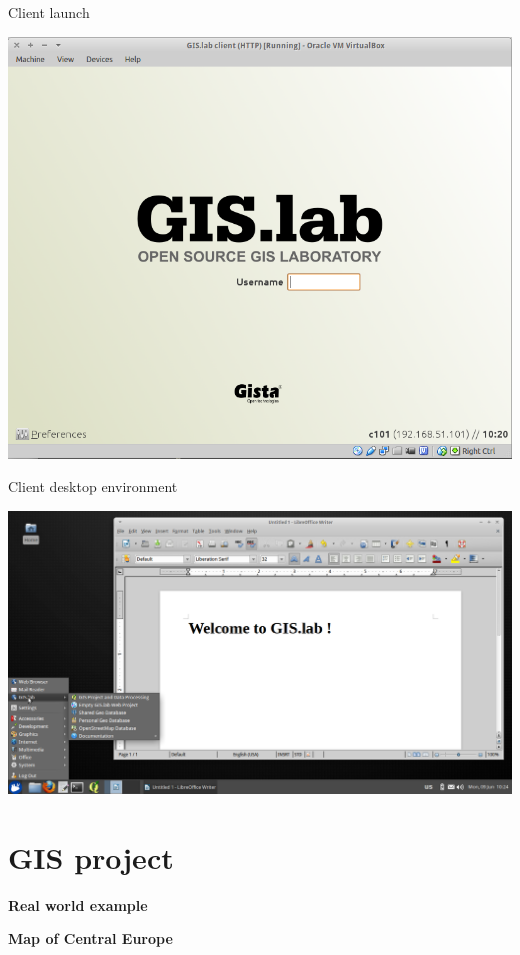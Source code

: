 \documentclass[12pt]{beamer}
\begin{document}
\begin{frame}{Client launch}
	\begin{center}
		\includegraphics[keepaspectratio=true,height=0.7\textheight]{images/real-world-example/client-login.png}
	\end{center}
\end{frame}


\begin{frame}{Client desktop environment}
	\begin{center}
		\includegraphics[keepaspectratio=true,height=0.7\textheight]{images/real-world-example/client-desktop-libreoffice.png}
	\end{center}
\end{frame}


\section{GIS project}
\begin{frame}
	\begin{center}
		\LARGE\textbf{Real world example}\normalsize

		\textbf{Map of Central Europe}
	\end{center}
\end{frame}
\end{document}
